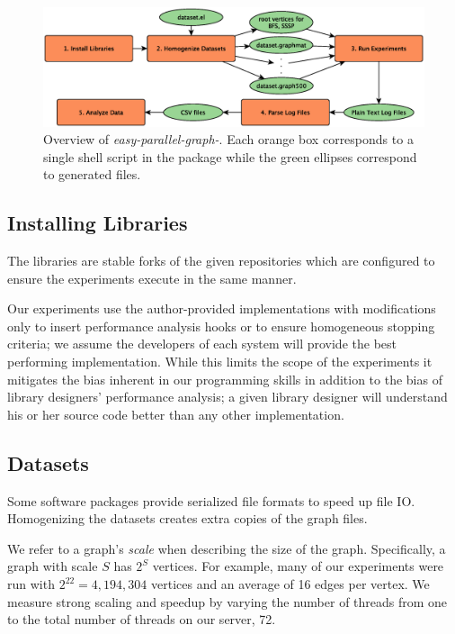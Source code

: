 \documentclass[conference]{IEEEtran}
\begin{document}
\begin{figure}
	\centering
		\includegraphics[width=\linewidth, trim=0 144pt 0pt 156pt, clip]{graphics/overview.eps}
	\caption{Overview of \emph{easy-parallel-graph-\textasteriskcentered}. Each orange box corresponds to a single shell script in the package while the green ellipses correspond to generated files.}
	\label{fig:epg-overview}
\end{figure}

\subsection{Installing Libraries}
The libraries are stable forks of the given repositories which are configured to ensure the experiments execute in the same manner.

Our experiments use the author-provided implementations with modifications only to insert performance analysis hooks or to ensure homogeneous stopping criteria; we assume the developers of each system will provide the best performing implementation. While this limits the scope of the experiments it mitigates the bias inherent in our programming skills in addition to the bias of library designers' performance analysis; a given library designer will understand his or her source code better than any other implementation.

\subsection{Datasets}
Some software packages provide serialized file formats to speed up file IO. Homogenizing the datasets creates extra copies of the graph files.

We refer to a graph's \emph{scale} when describing the size of the graph. Specifically, a graph with scale $S$ has $2^S$ vertices. For example, many of our experiments were run with $2^{22} = 4,194,304$ vertices and an average of 16 edges per vertex. We measure strong scaling and speedup by varying the number of threads from one to the total number of threads on our server, 72.
\end{document}
